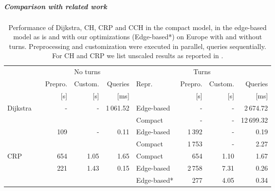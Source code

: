 \documentclass[a4paper, english, cleveref]{lipics-v2021}
\begin{document}
\subparagraph{Comparison with related work}

\begin{table}
\centering
\caption{
Performance of Dijkstra, CH, CRP and CCH in the compact model, in the edge-based model as is and with our optimizations (Edge-based*) on Europe with and without turns.
Preprocessing and customization were executed in parallel, queries sequentially.
For CH and CRP we list unscaled results as reported in \cite{DellingGPW17}.
}\label{tab:related_work}
\begin{tabular}{l@{\hskip4pt}crrrlrrr}
\toprule
{}                        &                                      & \multicolumn{3}{c}{No turns}                                           & \multicolumn{4}{c}{Turns}                  \\
                                                                   \cmidrule(lr){3-5}                                                       \cmidrule(lr){6-9}
{}                        &                                      &             Prepro.  &            Custom. &                    Queries & Repr.      & Prepro. & Custom. &   Queries \\
{}                        &                                      &                 [s]  &                [s] &                       [ms] &            &     [s] &     [s] &      [ms] \\
\midrule
\multirow{2}{*}{Dijkstra} &                                      &   \multirow{2}{*}{-} & \multirow{2}{*}{-} & \multirow{2}{*}{1\,061.52} & Edge-based &       - &       - &  2\,674.72 \\
                          &                                      &                      &                    &                            &    Compact &       - &       - & 12\,699.32 \\
\addlinespace
\multirow{2}{*}{CH}       & \multirow{2}{*}{\cite{DellingGPW17}} & \multirow{2}{*}{109} & \multirow{2}{*}{-} &      \multirow{2}{*}{0.11} & Edge-based &  1\,392 &       - &       0.19 \\
                          &                                      &                      &                    &                            &    Compact &  1\,753 &       - &       2.27 \\
\addlinespace
CRP                       & \cite{DellingGPW17}                  &                  654 &               1.05 &                       1.65 &    Compact &     654 &    1.10 &       1.67 \\
\addlinespace
\multirow{2}{*}{CCH}      &                                      & \multirow{2}{*}{221} & \multirow{2}{*}{1.43} &   \multirow{2}{*}{0.15} & Edge-based &  2\,758 &    7.31 &       0.26 \\
                          &                                      &                      &                    &                            & Edge-based* &    277 &    4.05 &       0.34 \\
\bottomrule
\end{tabular}
\end{table}
\end{document}
